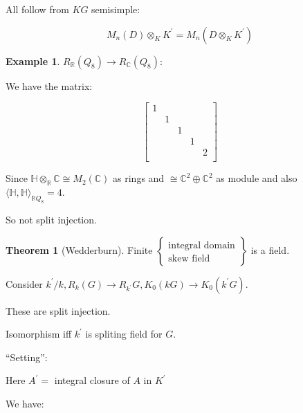 \documentclass{article}
\theoremstyle{definition}
\newtheorem*{example}{Example}
\newtheorem{theorem}{Theorem}
\begin{document}
All follow from \(KG\) semisimple:

\[
    M_n(D) \otimes_K K^{\prime} = M_n(D \otimes_K K^{\prime})
\]

\begin{example}
    \(R_\mathbb{R} (Q_8) \to R_\mathbb{C}(Q_8)\):

    We have the matrix:

    \[
        \begin{bmatrix}
            1 &  &  &  &   \\
             & 1 &  &  &   \\
             &  & 1 &  &   \\
             &  &  & 1 &   \\
             &  &  &  & 2  \\
        \end{bmatrix}
    \]

    Since \(\mathbb{H} \otimes_\mathbb{R} \mathbb{C} \cong M_2(\mathbb{C})\) as rings and \(\cong \mathbb{C}^2 \oplus \mathbb{C}^2\) as module and also \(\langle \mathbb{H} , \mathbb{H}  \rangle_{\mathbb{R} Q_8} = 4\).

    So not split injection.
\end{example}

\begin{theorem}
    [Wedderburn] Finite \(\begin{Bmatrix} \text{integral domain} \\ \text{skew field} \end{Bmatrix}\) is a field.
\end{theorem}

Consider \(k^{\prime} / k, R_k(G) \to R_{k^{\prime}}G, K_0(kG) \to K_0(k^{\prime} G)\).

These are split injection.

Isomorphism iff \(k^{\prime}\) is spliting field for \(G\).

``Setting'':

\begin{center}
\end{center}

Here \(A^{\prime} =\) integral closure of \(A\) in \(K^{\prime}\) 

We have:
\end{document}
